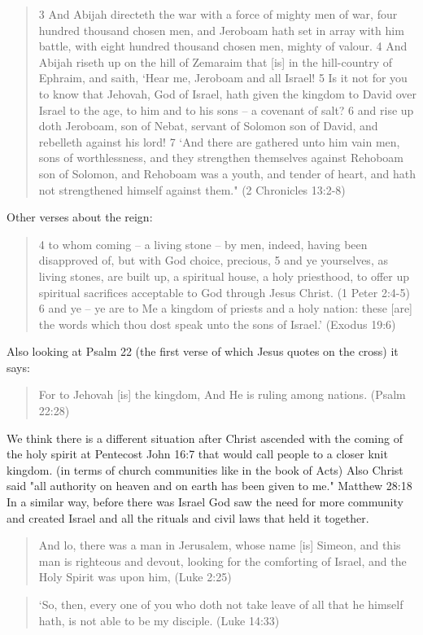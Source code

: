 \documentclass[11pt]{article}
\begin{document}
\begin{thebibliography}{37}
\begin{quote}
3 And Abijah directeth the war with a force of mighty men of war, four hundred thousand chosen men, and Jeroboam hath set in array with him battle, with eight hundred thousand chosen men, mighty of valour.
4 And Abijah riseth up on the hill of Zemaraim that [is] in the hill-country of Ephraim, and saith, `Hear me, Jeroboam and all Israel!
5 Is it not for you to know that Jehovah, God of Israel, hath given the kingdom to David over Israel to the age, to him and to his sons -- a covenant of salt?
6 and rise up doth Jeroboam, son of Nebat, servant of Solomon son of David, and rebelleth against his lord!
7 `And there are gathered unto him vain men, sons of worthlessness, and they strengthen themselves against Rehoboam son of Solomon, and Rehoboam was a youth, and tender of heart, and hath not strengthened himself against them." (2 Chronicles 13:2-8)
\end{quote}
Other verses about the reign:
\begin{quote}
4 to whom coming -- a living stone -- by men, indeed, having been disapproved of, but with God choice, precious,
5 and ye yourselves, as living stones, are built up, a spiritual house, a holy priesthood, to offer up spiritual sacrifices acceptable to God through Jesus Christ. (1 Peter 2:4-5)
6 and ye -- ye are to Me a kingdom of priests and a holy nation: these [are] the words which thou dost speak unto the sons of Israel.' (Exodus 19:6) 
\end{quote}
Also looking at Psalm 22 (the first verse of which Jesus quotes on the cross) it says:
\begin{quote}
For to Jehovah [is] the kingdom, And He is ruling among nations. (Psalm 22:28)
\end{quote}
We think there is a different situation after Christ ascended with the coming of the holy spirit at Pentecost John 16:7 that would call people to a closer knit kingdom. (in terms of church communities like in the book of Acts) Also Christ said "all authority on heaven and on earth has been given to me." Matthew 28:18 In a similar way, before there was Israel God saw the need for more community and created Israel and all the rituals and civil laws that held it together.
\begin{quote}
And lo, there was a man in Jerusalem, whose name [is] Simeon, and this man is righteous and devout, looking for the comforting of Israel, and the Holy Spirit was upon him, (Luke 2:25)
\end{quote}


\begin{quote}
`So, then, every one of you who doth not take leave of all that he himself hath, is not able to be my disciple.  (Luke 14:33)


\end{quote}
\end{thebibliography}
\end{document}
